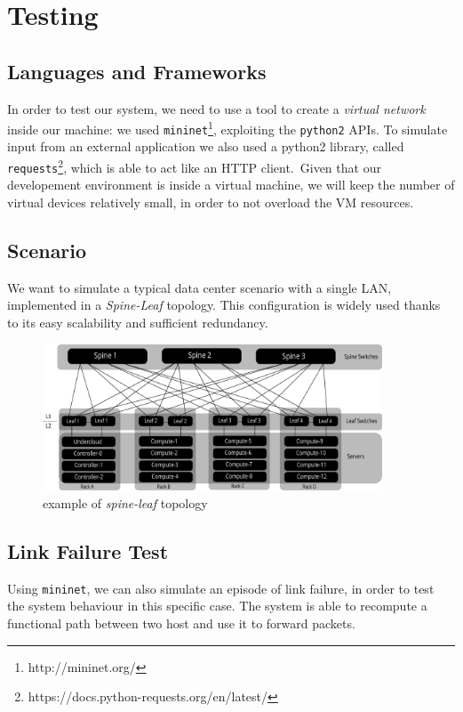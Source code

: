 \chapter{Testing}
\section*{Languages and Frameworks}
In order to test our system, we need to use a tool to create a \textit{virtual network} inside our machine: we used \texttt{mininet}\footnote{http://mininet.org/}, 
exploiting the \texttt{python2} APIs. To simulate input from an external application we also used a python2 library, called \texttt{requests}\footnote{https://docs.python-requests.org/en/latest/},
which is able to act like an HTTP client.\
Given that our developement environment is inside a virtual machine, we will keep the number of virtual devices relatively small, in order to not
overload the VM resources.

\section*{Scenario}
We want to simulate a typical data center scenario with a single LAN, implemented in a \textit{Spine-Leaf} topology. This configuration
is widely used thanks to its easy scalability and sufficient redundancy.
\begin{figure}[h]
    \centering
    \includegraphics[width=0.90\textwidth]{img/spine_leaf.pdf}
    \caption{example of \textit{spine-leaf} topology}
\end{figure}

\section{Link Failure Test}
\noindent Using \texttt{mininet}, we can also simulate an episode of link failure, in order to test the system behaviour in this specific case. The system is able to recompute a functional path between two host and use it to forward packets.

